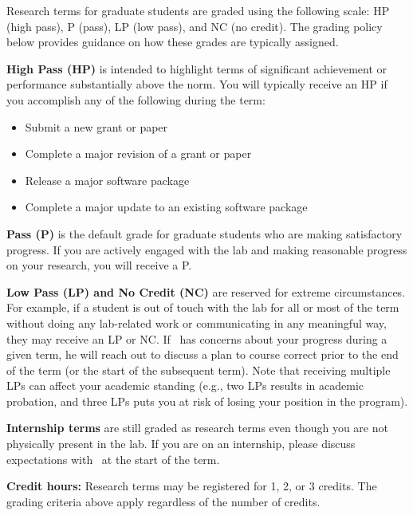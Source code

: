 \documentclass{tufte-book} %
\begin{document}

\noindent Research terms for graduate students are graded using the following
scale: HP (high pass), P (pass), LP (low pass), and NC (no credit). The grading
policy below provides guidance on how these grades are typically assigned.


\textbf{High Pass (HP)} is intended to highlight terms of significant
achievement or performance substantially above the norm. You will typically
receive an HP if you accomplish any of the following during the term:
\begin{itemize}
\item Submit a new grant or paper
\item Complete a major revision of a grant or paper
\item Release a major software package
\item Complete a major update to an existing software package
\end{itemize}

\textbf{Pass (P)} is the default grade for graduate students who are making
satisfactory progress. If you are actively engaged with the lab and making
reasonable progress on your research, you will receive a P.

\textbf{Low Pass (LP) and No Credit (NC)} are reserved for extreme
circumstances. For example, if a student is out of touch with the lab for all
or most of the term without doing any lab-related work or communicating in any
meaningful way, they may receive an LP or NC. If \director~has concerns about
your progress during a given term, he will reach out to discuss a plan to
course correct prior to the end of the term (or the start of the subsequent
term). Note that receiving multiple LPs can affect your academic standing (e.g.,
two LPs results in academic probation, and three LPs puts you at risk of losing
your position in the program).

\textbf{Internship terms} are still graded as research terms even though you
are not physically present in the lab. If you are on an internship, please
discuss expectations with \director~at the start of the term.

\textbf{Credit hours:} Research terms may be registered for 1, 2, or 3 credits.
The grading criteria above apply regardless of the number of credits.

\label{sec:compensation}
\end{document}
